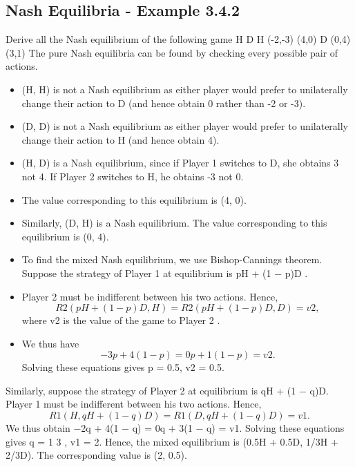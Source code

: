 \documentclass[]{report}
\begin{document}
\subsection{Nash Equilibria - Example 3.4.2}
Derive all the Nash equilibrium of the following game
H D
H (-2,-3) (4,0)
D (0,4) (3,1)
The pure Nash equilibria can be found by checking every possible
pair of actions.
\begin{itemize}
	\item (H, H) is not a Nash equilibrium as either player would prefer to
	unilaterally change their action to D (and hence obtain 0 rather
	than -2 or -3).
	\item (D, D) is not a Nash equilibrium as either player would prefer to
	unilaterally change their action to H (and hence obtain 4).
	\item (H, D) is a Nash equilibrium, since if Player 1 switches to D, she
	obtains 3 not 4. If Player 2 switches to H, he obtains -3 not 0.
	\item	The value corresponding to this equilibrium is (4, 0).
	\item	Similarly, (D, H) is a Nash equilibrium. The value corresponding to
	this equilibrium is (0, 4).
\end{itemize}

\begin{itemize}
	\item To find the mixed Nash equilibrium, we use Bishop-Cannings
	theorem. Suppose the strategy of Player 1 at equilibrium is
	pH + (1 − p)D . 	\item Player 2 must be indifferent between his two
	actions. Hence,
	\[R2(pH + (1 − p)D, H) = R2(pH + (1 − p)D, D) = v2,\]
	where v2 is the value of the game to Player 2 .
	\item We thus have \[−3p + 4(1 − p) = 0p + 1(1 − p) = v2.\] Solving these
	equations gives p = 0.5, v2 = 0.5.
\end{itemize}

Similarly, suppose the strategy of Player 2 at equilibrium is
qH + (1 − q)D. Player 1 must be indifferent between his two
actions. Hence,
\[R1(H, qH + (1 − q)D) = R1(D, qH + (1 − q)D) = v1.\]
We thus obtain −2q + 4(1 − q) = 0q + 3(1 − q) = v1. Solving
these equations gives q =
1
3
, v1 = 2.
Hence, the mixed equilibrium is (0.5H + 0.5D, 1/3H + 2/3D). The
corresponding value is (2, 0.5).
\end{document}

